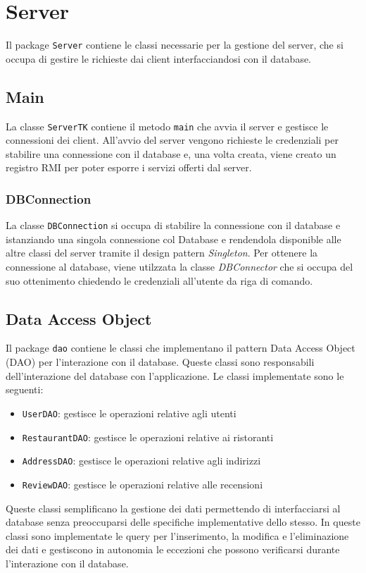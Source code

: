 \section{Server}
Il package \texttt{Server} contiene le classi necessarie per 
la gestione del server, che si occupa di gestire le richieste 
dai client interfacciandosi con il database.

\subsection{Main}
La classe \texttt{ServerTK} contiene il metodo \texttt{main} 
che avvia il server e gestisce le connessioni dei client.
All'avvio del server vengono richieste le credenziali per stabilire 
una connessione con il database e, una volta creata, viene creato un 
registro RMI per poter esporre i servizi offerti dal server.

\subsubsection{DBConnection}
La classe \texttt{DBConnection} si occupa di stabilire
la connessione con il database e 
istanziando una singola connessione col Database e rendendola disponible 
alle altre classi del server tramite il design pattern \textit{Singleton}.
Per ottenere la connessione al database, viene utilzzata la classe 
\textit{DBConnector} che si occupa del suo ottenimento
chiedendo le credenziali all'utente da riga di comando.

\subsection{Data Access Object}
Il package \texttt{dao} contiene le classi che implementano 
il pattern Data Access Object (DAO) per l'interazione
con il database. Queste classi sono responsabili dell'interazione 
del database con l'applicazione.
Le classi implementate sono le seguenti:
\begin{itemize}
    \item \texttt{UserDAO}: gestisce le operazioni relative agli utenti
    \item \texttt{RestaurantDAO}: gestisce le operazioni relative ai ristoranti
    \item \texttt{AddressDAO}: gestisce le operazioni relative agli indirizzi
    \item \texttt{ReviewDAO}: gestisce le operazioni relative alle recensioni
\end{itemize}
Queste classi semplificano la gestione dei dati permettendo 
di interfacciarsi al database senza preoccuparsi delle specifiche
implementative dello stesso. 
In queste classi sono implementate le query per l'inserimento, 
la modifica e l'eliminazione dei dati e gestiscono in autonomia 
le eccezioni che possono verificarsi durante l'interazione
con il database.

